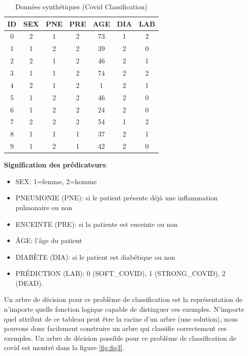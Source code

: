 \begin{table}
    \centering
    \begin{tabular}{ |c|c|c|c|c|c|c| }
        \hline
        ID & SEX & PNE & PRE & AGE & DIA & LAB \\
        \hline
        0 & 2 & 1 & 2 & 73 & 1 & 2 \\
        \hline
        1 & 1 & 2 & 2 & 39 & 2 & 0 \\
        \hline
        2 & 2 & 1 & 2 & 46 & 2 & 1 \\
        \hline
        3 & 1 & 1 & 2 & 74 & 2 & 2 \\
        \hline
        4 & 2 & 1 & 2 & 1 & 2 & 1 \\
        \hline
        5 & 1 & 2 & 2 & 46 & 2 & 0 \\
        \hline
        6 & 1 & 2 & 2 & 24 & 2 & 0 \\
        \hline
        7 & 2 & 2 & 2 & 54 & 1 & 2 \\
        \hline
        8 & 1 & 1 & 1 & 37 & 2 & 1 \\
        \hline
        9 & 1 & 2 & 1 & 42 & 2 & 0 \\
        \hline
    \end{tabular}
    \caption{Données synthétiques (Covid Classification)}
    \label{tab:tab1}
\end{table}

\textbf{Signification des prédicateurs}:

\begin{itemize}
    \item SEX: 1=femme, 2=homme
    \item PNEUMONIE (PNE): si le patient présente déjà une inflammation pulmonaire ou non
    \item ENCEINTE (PRE): si la patiente est enceinte ou non
    \item ÂGE: l'âge du patient
    \item DIABÈTE (DIA): si le patient est diabétique ou non
    \item PRÉDICTION (LAB): 0 (SOFT\_COVID), 1 (STRONG\_COVID), 2 (DEAD).
\end{itemize}

Un arbre de décision pour ce problème de classification est la représentation de n'importe quelle fonction logique capable de distinguer ces exemples. N'importe quel attribut de ce tableau peut être la racine d'un arbre (une solution), nous pouvons donc facilement construire un arbre qui classifie correctement ces exemples. Un arbre de décision possible pour ce problème de classification de covid est montré dans la figure \ref{fig:fig3}. 

